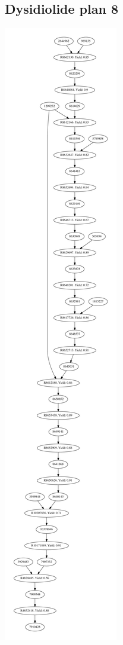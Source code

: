 \documentclass[a4paper,10pt,titlepage]{paper}
\begin{document}
\subsection{Dysidiolide plan 8}
\centering
\includegraphics[scale=0.4]{Synteseplaner/Dysidiolide/plan8.pdf}
\label{Appendix::Dysidiolide8}
\end{document}
